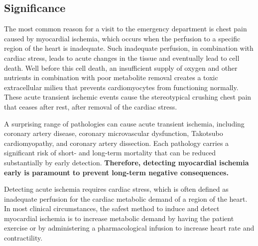 \subsection{Significance}
\label{sec:signif}

The most common reason for a visit to the emergency department is chest pain caused by myocardial ischemia\cite{BLZ:Saf2018,BLZ:Bhu2010}, which occurs when the perfusion to a specific region of the heart is inadequate.\cite{BMB:Hea94,BMB:Fal2007} Such inadequate perfusion, in combination with cardiac stress, leads to acute changes in the tissue and eventually lead to cell death. Well before this cell death, an insufficient supply of oxygen and other nutrients in combination with poor metabolite removal creates a toxic extracellular milieu that prevents cardiomyocytes from functioning normally.\cite{BMB:Kat2011,BMB:Foz86} These acute transient ischemic events cause the stereotypical crushing chest pain that ceases after rest, \ie{} after removal of the cardiac stress.\cite{BMB:Kat2011,BMB:Sur2011b}

A surprising range of pathologies can cause acute transient ischemia, including coronary artery disease, coronary microvascular dysfunction, Takotsubo cardiomyopathy, and coronary artery dissection.\cite{BLZ:Saf2018,BLZ:Jes2013,BLZ:Noe2017,BLZ:Jes2012} Each pathology carries a significant risk of short- and long-term mortality that can be reduced substantially by early detection.\cite{BLZ:Noe2017} \textbf{Therefore, detecting myocardial ischemia early is paramount to prevent long-term negative consequences.}\cite{BMB:Kon99,BLZ:Saf2018,BLZ:Knu2018a}

Detecting acute ischemia requires cardiac stress, which is often defined as inadequate perfusion for the cardiac metabolic demand of a region of the heart.\cite{BLZ:Pue2004} In most clinical circumstances, the safest method to induce and detect myocardial ischemia is to increase metabolic demand by having the patient exercise or by administering a pharmacological infusion to increase heart rate and contractility.\cite{RSM:Ste2002,BLZ:Saf2018,BLZ:Knu2018a}

